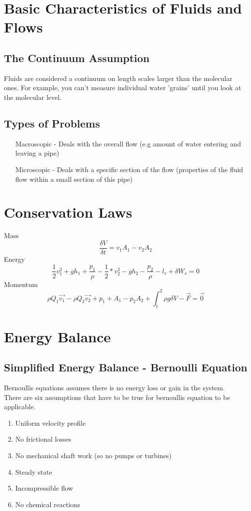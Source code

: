 \documentclass[12pt,a4paper]{article}
\begin{document}
    \newpage

    \section{Basic Characteristics of Fluids and Flows}
        \subsection{The Continuum Assumption}
            Fluids are considered a continuum on length scales larger than the molecular ones. For example, you can't measure individual water 'grains' until you look at the molecular level.
        
        \subsection{Types of Problems}
            \begin{itemize}
                \item[Macroscopic - ] Deals with the overall flow (e.g amount of water entering and leaving a pipe)
                \item[Microscopic - ] Deals with a specific section of the flow (properties of the fluid flow within a small section of this pipe)
            \end{itemize}
            
\section{Conservation Laws}
    Mass
    \[\frac{\delta V}{\delta t}=v_1A_1-v_2A_2\]
    Energy
    \[\frac{1}{2}v^2_1+gh_1+\frac{p_1}{\rho}-\frac{1}{2}*v^2_2-gh_2-\frac{p_2}{\rho}-l_v+\delta W_s=0 \]
    Momentum
    \[\rho Q_1\vec{v_1}-\rho Q_2\vec{v_2}+p_1+A_1-p_2A_2+\int_{1}^{2}\rho g \delta V -\vec{F}=\vec{0}\]

\newpage

\section{Energy Balance}
    \subsection{Simplified Energy Balance - Bernoulli Equation}
        Bernoullis equations assumes there is no energy loss or gain in the system. \\
        There are six assumptions that have to be true for bernoullis equation to be applicable.
        \begin{enumerate}
            \item Uniform velocity profile
            \item No frictional losses
            \item No mechanical shaft work (so no pumps or turbines)
            \item Steady state
            \item Incompressible flow
            \item No chemical reactions
        \end{enumerate}
\end{document}
